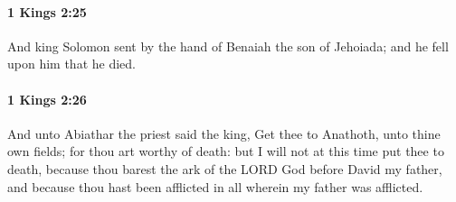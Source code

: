 		\paragraph{1 Kings 2:25} %
			\label{1KINGS-2-25}

			And king Solomon sent by the hand of Benaiah the son of Jehoiada; and he fell upon him that he died.


		\paragraph{1 Kings 2:26} %
			\label{1KINGS-2-26}

			And unto Abiathar the priest said the king, Get thee to Anathoth, unto thine own fields; for thou art worthy of death: but I will not at this time put thee to death, because thou barest the ark of the LORD God before David my father, and because thou hast been afflicted in all wherein my father was afflicted.

